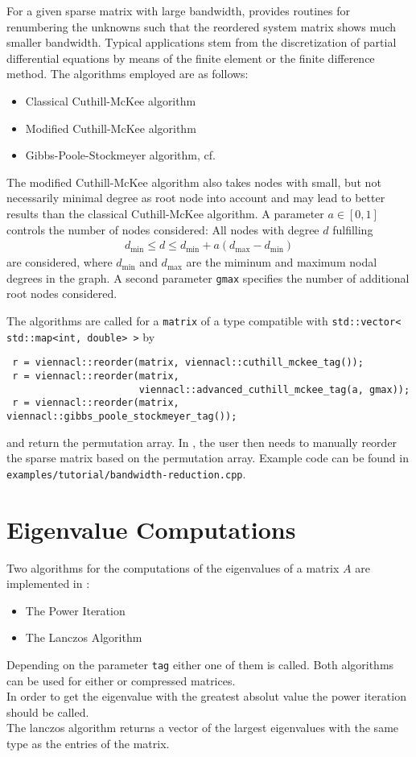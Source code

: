 For a given sparse matrix with large bandwidth, {\ViennaCL} provides routines for renumbering the unknowns such that the reordered system matrix shows much
smaller bandwidth. Typical applications stem from the discretization of partial differential equations by means of the finite element or the finite difference
method. The algorithms employed are as follows:
\begin{itemize}
 \item Classical Cuthill-McKee algorithm \cite{cuthill:reducing-bandwidth}
 \item Modified Cuthill-McKee algorithm \cite{cuthill:reducing-bandwidth}
 \item Gibbs-Poole-Stockmeyer algorithm, cf.~\cite{lewis:gps-algorithm}
\end{itemize}
The modified Cuthill-McKee algorithm also takes nodes with small, but not necessarily minimal degree as root node into account and may lead to better results
than the classical Cuthill-McKee algorithm. A parameter $a \in [0,1]$ controls the number of nodes considered: All nodes with degree $d$ fulfilling
\begin{align*}
 d_{\min} \leq d \leq d_{\min} + a(d_{\max} - d_{\min})
\end{align*}
are considered, where $d_{\min}$ and $d_{\max}$ are the miminum and maximum nodal degrees in the graph. A second parameter \lstinline|gmax| specifies the
number of additional root nodes considered.

The algorithms are called for a \lstinline|matrix| of a type compatible with \lstinline|std::vector< std::map<int, double> >| by
\begin{lstlisting}
 r = viennacl::reorder(matrix, viennacl::cuthill_mckee_tag());
 r = viennacl::reorder(matrix, 
                       viennacl::advanced_cuthill_mckee_tag(a, gmax));
 r = viennacl::reorder(matrix, viennacl::gibbs_poole_stockmeyer_tag());
\end{lstlisting}
and return the permutation array. In {\ViennaCLversion}, the user then needs to manually reorder the sparse matrix based on the permutation array. Example code
can be found in \lstinline|examples/tutorial/bandwidth-reduction.cpp|.


\section{Eigenvalue Computations}
Two algorithms for the computations of the eigenvalues of a matrix $A$ are implemented in {\ViennaCL}:
\begin{itemize}
\item The Power Iteration \cite{golub:matrix-computations}
\item The Lanczos Algorithm \cite{simon:lanczos-pro}
\end{itemize}
Depending on the parameter \lstinline|tag| either one of them is called. 
Both algorithms can be used for either {\ublas} or {\ViennaCL} compressed matrices.\\
In order to get the eigenvalue with the greatest absolut value the power iteration should be called. \\
The lanczos algorithm returns a vector of the largest eigenvalues with the same type as the entries of the matrix.

